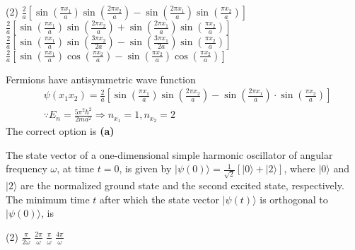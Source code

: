 \begin{enumerate}
\begin{minipage}{\textwidth}
\end{minipage}
\begin{tasks}(2)
	\task[\textbf{A.}] $\frac{2}{a}\left[\sin \left(\frac{\pi x_{1}}{a}\right) \sin \left(\frac{2 \pi x_{2}}{a}\right)-\sin \left(\frac{2 \pi x_{1}}{a}\right) \sin \left(\frac{\pi x_{2}}{a}\right)\right]$
	\task[\textbf{B.}]$\frac{2}{a}\left[\sin \left(\frac{\pi x_{1}}{a}\right) \sin \left(\frac{2 \pi x_{2}}{a}\right)+\sin \left(\frac{2 \pi x_{1}}{a}\right) \sin \left(\frac{\pi x_{2}}{a}\right)\right]$
	\task[\textbf{C.}]$\frac{2}{a}\left[\sin \left(\frac{\pi x_{1}}{a}\right) \sin \left(\frac{3 \pi x_{2}}{2 a}\right)-\sin \left(\frac{3 \pi x_{1}}{2 a}\right) \sin \left(\frac{\pi x_{2}}{a}\right)\right]$
	\task[\textbf{D.}]$\frac{2}{a}\left[\sin \left(\frac{\pi x_{1}}{a}\right) \cos \left(\frac{\pi x_{2}}{a}\right)-\sin \left(\frac{\pi x_{2}}{a}\right) \cos \left(\frac{\pi x_{2}}{a}\right)\right]$
\end{tasks}
\begin{answer}
	 Fermions have antisymmetric wave function\\
	 \begin{align*}
	 	&\psi\left(x_{1} x_{2}\right)=\frac{2}{a}\left[\sin \left(\frac{\pi x_{1}}{a}\right) \sin \left(\frac{2 \pi x_{2}}{a}\right)-\sin \left(\frac{2 \pi x_{1}}{a}\right) \cdot \sin \left(\frac{\pi x_{2}}{a}\right)\right] \\
	 	&\because E_{n}=\frac{5 \pi^{2} \hbar^{2}}{2 m a^{2}} \Rightarrow n_{x_{1}}=1, n_{x_{2}}=2
	 \end{align*}
	 The correct option is \textbf{(a)}
\end{answer}
\begin{minipage}{\textwidth}
	\item The state vector of a one-dimensional simple harmonic oscillator of angular frequency $\omega$, at time $t=0$, is given by $|\psi(0)\rangle=\frac{1}{\sqrt{2}}[|0\rangle+|2\rangle]$, where $|0\rangle$ and $|2\rangle$ are the normalized ground state and the second excited state, respectively. The minimum time $t$ after which the state vector $|\psi(t)\rangle$ is orthogonal to $|\psi(0)\rangle$, is
\end{minipage}
\begin{tasks}(2)
	\task[\textbf{A.}] $\frac{\pi}{2 \omega}$
	\task[\textbf{B.}]$\frac{2 \pi}{\omega}$
	\task[\textbf{C.}]$\frac{\pi}{\omega}$
	\task[\textbf{D.}]$\frac{4 \pi}{\omega}$
\end{tasks}
\begin{answer}

\end{answer}
\end{enumerate}
